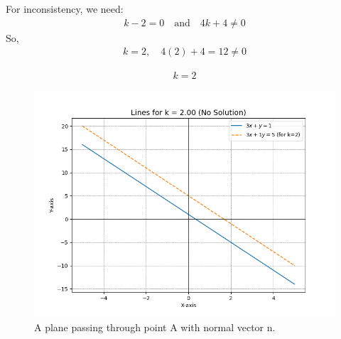 \documentclass[journal]{IEEEtran}
\begin{document}
For inconsistency, we need:
\begin{align}
k-2 = 0 \quad \text{and} \quad 4k+4 \neq 0
\end{align}
So,
\begin{align}
k = 2, \quad 4(2)+4 = 12 \neq 0
\end{align}

\begin{align*}
\boxed{k = 2}
\end{align*}
\newpage
\begin{figure}[h!]
\begin{center}
\includegraphics[width=\columnwidth]{figs/fig5.png}
\end{center}
\caption{A plane passing through point A with normal vector n.}
\label{fig:Fig.1}
\end{figure}
\end{document}

